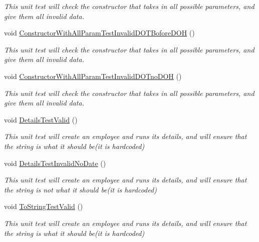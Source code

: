 \begin{DoxyCompactItemize}
\begin{DoxyCompactList}\small\item\em This unit test will check the constructor that takes in all possible parameters, and give them all invalid data. \end{DoxyCompactList}\item 
void \hyperlink{class_my_all_employee_1_1_tests_1_1_contract_employee_tests_a036e75236b91f73f5c90513b6770c6b1}{Constructor\+With\+All\+Param\+Test\+Invalid\+D\+O\+T\+Bofore\+D\+O\+H} ()
\begin{DoxyCompactList}\small\item\em This unit test will check the constructor that takes in all possible parameters, and give them all invalid data. \end{DoxyCompactList}\item 
void \hyperlink{class_my_all_employee_1_1_tests_1_1_contract_employee_tests_a5a23d0f0d7baec8ebcfda76674b5fa65}{Constructor\+With\+All\+Param\+Test\+Invalid\+D\+O\+Tno\+D\+O\+H} ()
\begin{DoxyCompactList}\small\item\em This unit test will check the constructor that takes in all possible parameters, and give them all invalid data. \end{DoxyCompactList}\item 
void \hyperlink{class_my_all_employee_1_1_tests_1_1_contract_employee_tests_a97b02dfac3cfb319d67d5794fbb532ac}{Details\+Test\+Valid} ()
\begin{DoxyCompactList}\small\item\em This unit test will create an employee and runs it\textquotesingle{}s details, and will ensure that the string is what it should be(it is hardcoded) \end{DoxyCompactList}\item 
void \hyperlink{class_my_all_employee_1_1_tests_1_1_contract_employee_tests_a08805c288350931d63fdd171e097efb5}{Details\+Test\+Invalid\+No\+Date} ()
\begin{DoxyCompactList}\small\item\em This unit test will create an employee and runs it\textquotesingle{}s details, and will ensure that the string is not what it should be(it is hardcoded) \end{DoxyCompactList}\item 
void \hyperlink{class_my_all_employee_1_1_tests_1_1_contract_employee_tests_af20290a987245aae2cccc0ed7605f594}{To\+String\+Test\+Valid} ()
\begin{DoxyCompactList}\small\item\em This unit test will create an employee and runs it\textquotesingle{}s details, and will ensure that the string is what it should be(it is hardcoded) \end{DoxyCompactList}\item 

\end{DoxyCompactItemize}

